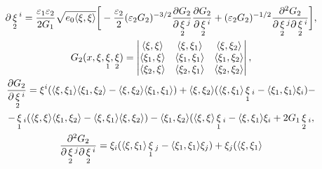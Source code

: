\begin{pf}
\begin{gather*}
{\partial\mymath{\xi}_2{}^i}=\frac{\varepsilon_1\varepsilon_2}{2G_1} 


\sqrt{e_0\la\xi,\xi\ra}\bigg[-\frac{\varepsilon_2}{2} 


(\varepsilon_2G_2)^{-3/2}\frac{\partial G_2} 


{\partial\mymath{\xi}_2{}^j}\frac{\partial G_2} 


{\partial\mymath{\xi}_2{}^i}+(\varepsilon_2G_2)^{-1/2} 


\frac{\partial^2G_2}{\partial\mymath{\xi}_2{}^j 


\partial\mymath{\xi}_2{}^i}\bigg],\\ 


% 


G_2(x,\xi,\mymath{\xi}_1,\mymath{\xi}_2)= 


\begin{vmatrix} 


\la\xi,\xi\ra & \la\xi,\xi_1\ra & \la\xi,\xi_2\ra \\ 


\la\xi_1,\xi\ra & \la\xi_1,\xi_1\ra & \la\xi_1,\xi_2\ra \\ 


\la\xi_2,\xi\ra & \la\xi_2,\xi_1\ra & \la\xi_2,\xi_2\ra 


\end{vmatrix} 


,\\ 


\frac{\partial G_2}{\partial\mymath{\xi}_2{}^i}=\xi^i( 


\la\xi,\xi_1\ra \la\xi_1,\xi_2\ra-\la\xi,\xi_2\ra 


\la\xi_1,\xi_1\ra)+\la\xi,\xi_2\ra(\la\xi,\xi_1\ra 


\mymath{\xi}_1{}_i-\la\xi_1,\xi_1\ra\xi_i)-\\ 


% 


-\mymath{\xi}_1{}_i(\la\xi,\xi\ra \la\xi_1,\xi_2\ra- 


\la\xi,\xi_1\ra \la\xi,\xi_2\ra)-\la\xi_1,\xi_2\ra 


(\la\xi,\xi\ra\mymath{\xi}_1{}_i-\la\xi,\xi_1\ra\xi_i+ 


2G_1\mymath{\xi}_2{}_i,\\ 


% 


\frac{\partial^2G_2}{\partial\mymath{\xi}_2{}^j 


\partial\mymath{\xi}_2{}^i}=\xi_i(\la\xi,\xi_1\ra 


\mymath{\xi}_1{}_j-\la\xi_1,\xi_1\ra\xi_j)+\xi_j(\la\xi,\xi_1\ra 



\end{gather*}
\end{pf}
